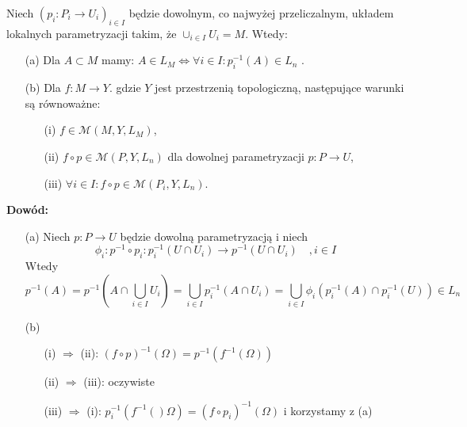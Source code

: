 \begin{tw}
	Niech $(p_i: P_i \rightarrow U_i)_{i \in I}$ będzie dowolnym, co najwyżej przeliczalnym, układem lokalnych parametryzacji takim, że $\cup_{i \in I} U_i = M$. Wtedy:
	\begin{enumerate}
		\item[(a)] Dla $A \subset M$ mamy: $A \in L_M \Leftrightarrow \forall i \in I: p_i^{-1}(A) \in L_n$ .
		\item[(b)] Dla $f: M \rightarrow Y$. gdzie $Y$ jest przestrzenią topologiczną, następujące warunki są równoważne:
			\begin{enumerate}
				\item[(i)] $f \in \mathcal{M}(M, Y, L_M)$,
				\item[(ii)] $f \circ p \in \mathcal{M}(P, Y, L_n)$ dla dowolnej parametryzacji $p: P \rightarrow U$,
				\item[(iii)] $\forall i \in I: f \circ p \in \mathcal{M}(P_i, Y, L_n)$.
			\end{enumerate}
	\end{enumerate}
	\textbf{Dowód:}
	\begin{enumerate}
		\item[(a)] Niech $p: P \rightarrow U$ będzie dowolną parametryzacją i niech 
		$$
			\phi_i: p^{-1} \circ p_i: p^{-1}_i(U \cap U_i) \rightarrow p^{-1}(U \cap U_i) \quad , i \in I
		$$
		Wtedy 
		$$
			p^{-1}(A) = p^{-1}(A \cap \bigcup_{i\in I} U_i) = \bigcup_{i \in I} p^{-1}_i(A \cap U_i) = \bigcup_{i \in I} \phi_i(p_i^{-1}(A) \cap p_i^{-1}(U)) \in L_n
		$$ 
		\item[(b)]
			\begin{enumerate} 
				\item[(i)] $\Longrightarrow$ (ii): $(f \circ p)^{-1}(\Omega) = p^{-1}(f^{-1}(\Omega))$ 
				\item[(ii)] $\Longrightarrow$ (iii): oczywiste
				\item[(iii)] $\Longrightarrow$ (i): $p_i^{-1}(f^{-1}()\Omega) = (f \circ p_i)^{-1}(\Omega)$ i korzystamy z (a)
			\end{enumerate}
	\end{enumerate}
\end{tw}